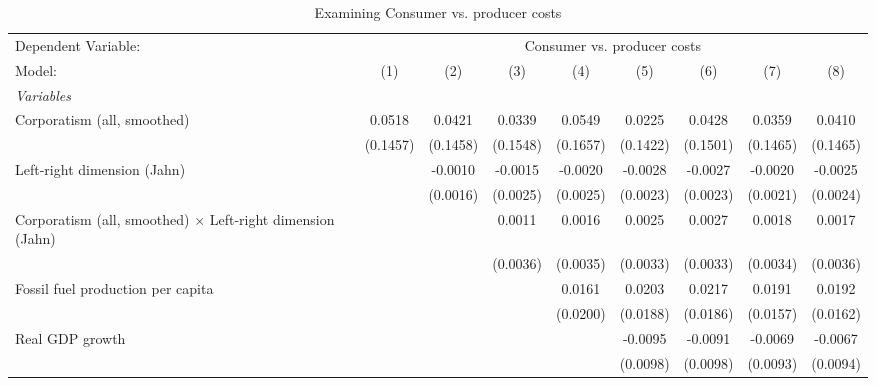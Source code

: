 
\begin{table}[htbp]
   \caption{Examining Consumer vs. producer costs}
   \centering
   \begin{tabular}{lcccccccc}
      \tabularnewline \midrule \midrule
      Dependent Variable: & \multicolumn{8}{c}{Consumer vs. producer costs}\\
      Model:                                                            & (1)      & (2)      & (3)      & (4)      & (5)      & (6)      & (7)      & (8)\\  
      \midrule
      \emph{Variables}\\
      Corporatism (all, smoothed)                                       & 0.0518   & 0.0421   & 0.0339   & 0.0549   & 0.0225   & 0.0428   & 0.0359   & 0.0410\\   
                                                                        & (0.1457) & (0.1458) & (0.1548) & (0.1657) & (0.1422) & (0.1501) & (0.1465) & (0.1465)\\   
      Left-right dimension (Jahn)                                       &          & -0.0010  & -0.0015  & -0.0020  & -0.0028  & -0.0027  & -0.0020  & -0.0025\\   
                                                                        &          & (0.0016) & (0.0025) & (0.0025) & (0.0023) & (0.0023) & (0.0021) & (0.0024)\\   
      Corporatism (all, smoothed) $\times$ Left-right dimension (Jahn)  &          &          & 0.0011   & 0.0016   & 0.0025   & 0.0027   & 0.0018   & 0.0017\\   
                                                                        &          &          & (0.0036) & (0.0035) & (0.0033) & (0.0033) & (0.0034) & (0.0036)\\   
      Fossil fuel production per capita                                 &          &          &          & 0.0161   & 0.0203   & 0.0217   & 0.0191   & 0.0192\\   
                                                                        &          &          &          & (0.0200) & (0.0188) & (0.0186) & (0.0157) & (0.0162)\\   
      Real GDP growth                                                   &          &          &          &          & -0.0095  & -0.0091  & -0.0069  & -0.0067\\   
                                                                        &          &          &          &          & (0.0098) & (0.0098) & (0.0093) & (0.0094)\\   

\end{tabular}
\end{table}
